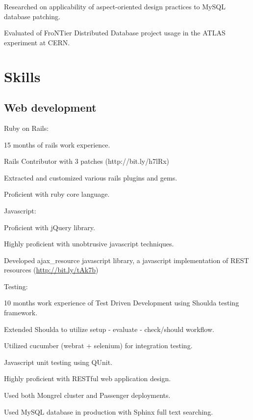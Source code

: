 \documentclass{resume}
\begin{document}
\begin{compactitem}
  \item Researched on applicability of aspect-oriented design practices to MySQL database patching.
  \item Evaluated of FroNTier Distributed Database project usage in the ATLAS experiment at CERN.
\end{compactitem}

\section{Skills}

\subsection{Web development}

\begin{compactitem}
  \item Ruby on Rails:
    \begin{compactitem}
      \item 15 months of rails work experience.
      \item Rails Contributor with 3 patches (http://bit.ly/h7lRx)
      \item Extracted and customized various rails plugins and gems.
      \item Proficient with ruby core language.
    \end{compactitem}

  \item Javascript:
    \begin{compactitem}
      \item Proficient with jQuery library.
      \item Highly proficient with unobtrusive javascript techniques.
      \item Developed ajax\_resource javascript library, a javascript implementation of REST resources (\url{http://bit.ly/tAk7b})
    \end{compactitem}

  \item Testing:
    \begin{compactitem}
      \item 10 months work experience of Test Driven Development using Shoulda testing framework.
      \item Extended Shoulda to utilize setup - evaluate - check/should workflow.
      \item Utilized cucumber (webrat + selenium) for integration testing.
      \item Javascript unit testing using QUnit.
    \end{compactitem}

  \item Highly proficient with RESTful web application design.
  \item Used both Mongrel cluster and Passenger deployments.
  \item Used MySQL database in production with Sphinx full text searching.
\end{compactitem}
\end{document}

